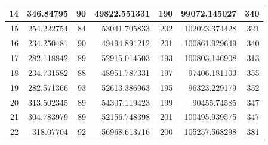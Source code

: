 \begin{table}
\begin{adjustwidth}{}{}
{{\begin{tabular}{|r|r|r|r|r|r|r|}
	\hline
	14                                         & 346.84795                    & 90                                    & 49822.551331                   & 190                                   & 99072.145027                 & 340                                    \\ 
	\hline
	15                                         & 254.222754                   & 84                                    & 53041.705833                   & 202                                   & 102023.374428                & 321                                    \\ 
	\hline
	16                                         & 234.250481                   & 90                                    & 49494.891212                   & 201                                   & 100861.929649                & 340                                    \\ 
	\hline
	17                                         & 282.118842                   & 89                                    & 52915.014503                   & 193                                   & 100803.146908                & 313                                    \\ 
	\hline
	18                                         & 234.731582                   & 88                                    & 48951.787331                   & 197                                   & 97406.181103                 & 355                                    \\ 
	\hline
	19                                         & 282.571366                   & 93                                    & 52613.386963                   & 195                                   & 96323.229179                 & 352                                    \\ 
	\hline
	20                                         & 313.502345                   & 89                                    & 54307.119423                   & 199                                   & 90455.74585                  & 347                                    \\ 
	\hline
	21                                         & 304.783979                   & 89                                    & 52156.748398                   & 201                                   & 100495.939575                & 347                                    \\ 
	\hline
	22                                         & 318.07704                    & 92                                    & 56968.613716                   & 200                                   & 105257.568298                & 381                                    \\ 

\end{tabular}}}
\end{adjustwidth}
\end{table}
